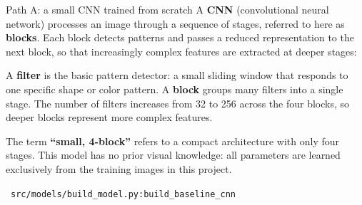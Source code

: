 \documentclass[aspectratio=169]{beamer}
\begin{document}
\begin{frame}{Path A: a small CNN trained from scratch}
\footnotesize
A \textbf{CNN} (convolutional neural network) processes an image through a
sequence of stages, referred to here as \textbf{blocks}. Each block detects
patterns and passes a reduced representation to the next block, so that
increasingly complex features are extracted at deeper stages:

\vspace{0.3em}
\begin{center}
\end{center}

\vspace{0.2em}
A \textbf{filter} is the basic pattern detector: a small sliding window that
responds to one specific shape or color pattern. A \textbf{block} groups
many filters into a single stage. The number of filters increases from 32
to 256 across the four blocks, so deeper blocks represent more complex
features.

\vspace{0.2em}
The term \textbf{``small, 4-block''} refers to a compact architecture with
only four stages. This model has no prior visual knowledge: all parameters
are learned exclusively from the training images in this project.

\vspace{0.05em}
{\scriptsize\color{black!55}\textrightarrow\ \texttt{src/models/build\_model.py:build\_baseline\_cnn}}
\end{frame}
\end{document}

